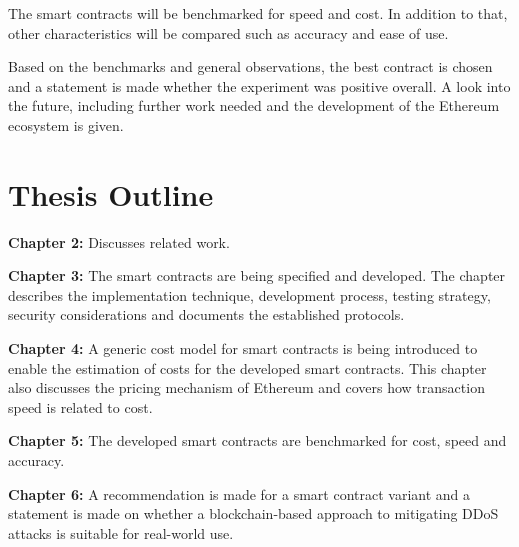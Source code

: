 The smart contracts will be benchmarked for speed and cost. In addition to that, other characteristics will be compared such as accuracy and ease of use. 

Based on the benchmarks and general observations, the best contract is chosen and a statement is made whether the experiment was positive overall. A look into the future, including further work needed and the development of the Ethereum ecosystem is given.

\section{Thesis Outline}

\textbf{Chapter 2:} Discusses related work. 

\textbf{Chapter 3:} The smart contracts are being specified and developed. The chapter describes the implementation technique, development process, testing strategy, security considerations and documents the established protocols.

\textbf{Chapter 4:} A generic cost model for smart contracts is being introduced to enable the estimation of costs for the developed smart contracts. This chapter also discusses the pricing mechanism of Ethereum and covers how transaction speed is related to cost.

\textbf{Chapter 5:} The developed smart contracts are benchmarked for cost, speed and accuracy. 

\textbf{Chapter 6:} A recommendation is made for a smart contract variant and a statement is made on whether a blockchain-based approach to mitigating DDoS attacks is suitable for real-world use.
